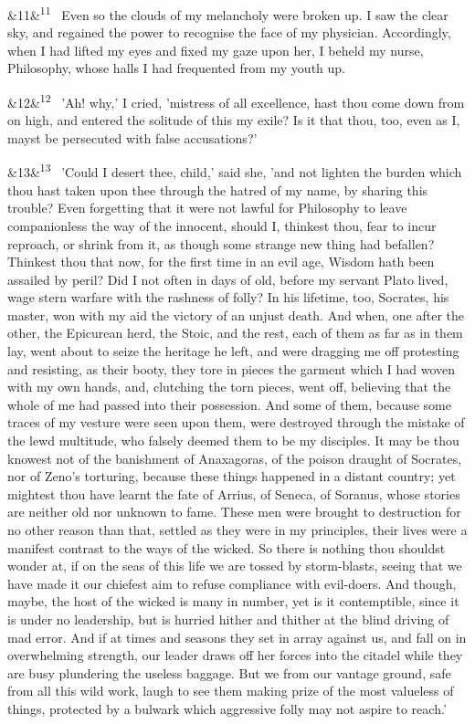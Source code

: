 \documentclass[12pt]{article}
\newcommand{\para}[1][]{\par\noindent\ifx&#1&\else\textsuperscript{\footnotesize #1}~\fi}
\begin{document}
\para[11] Even so the clouds of my melancholy were broken up. I saw the clear sky, and regained the power to recognise the face of my physician. Accordingly, when I had lifted my eyes and fixed my gaze upon her, I beheld my nurse, Philosophy, whose halls I had frequented from my youth up.

\para[12] 'Ah! why,' I cried, 'mistress of all excellence, hast thou come down from on high, and entered the solitude of this my exile? Is it that thou, too, even as I, mayst be persecuted with false accusations?'

\para[13] 'Could I desert thee, child,' said she, 'and not lighten the burden which thou hast taken upon thee through the hatred of my name, by sharing this trouble? Even forgetting that it were not lawful for Philosophy to leave companionless the way of the innocent, should I, thinkest thou, fear to incur reproach, or shrink from it, as though some strange new thing had befallen? Thinkest thou that now, for the first time in an evil age, Wisdom hath been assailed by peril? Did I not often in days of old, before my servant Plato lived, wage stern warfare with the rashness of folly? In his lifetime, too, Socrates, his master, won with my aid the victory of an unjust death. And when, one after the other, the Epicurean herd, the Stoic, and the rest, each of them as far as in them lay, went about to seize the heritage he left, and were dragging me off protesting and resisting, as their booty, they tore in pieces the garment which I had woven with my own hands, and, clutching the torn pieces, went off, believing that the whole of me had passed into their possession. And some of them, because some traces of my vesture were seen upon them, were destroyed through the mistake of the lewd multitude, who falsely deemed them to be my disciples. It may be thou knowest not of the banishment of Anaxagoras, of the poison draught of Socrates, nor of Zeno's torturing, because these things happened in a distant country; yet mightest thou have learnt the fate of Arrius, of Seneca, of Soranus, whose stories are neither old nor unknown to fame. These men were brought to destruction for no other reason than that, settled as they were in my principles, their lives were a manifest contrast to the ways of the wicked. So there is nothing thou shouldst wonder at, if on the seas of this life we are tossed by storm-blasts, seeing that we have made it our chiefest aim to refuse compliance with evil-doers. And though, maybe, the host of the wicked is many in number, yet is it contemptible, since it is under no leadership, but is hurried hither and thither at the blind driving of mad error. And if at times and seasons they set in array against us, and fall on in overwhelming strength, our leader draws off her forces into the citadel while they are busy plundering the useless baggage. But we from our vantage ground, safe from all this wild work, laugh to see them making prize of the most valueless of things, protected by a bulwark which aggressive folly may not aspire to reach.'
\end{document}
